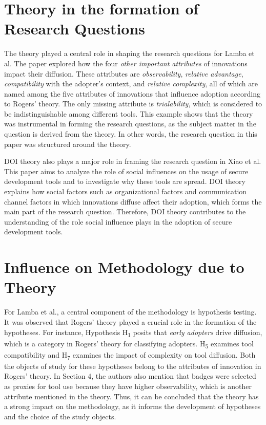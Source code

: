 \documentclass[journal,12pt,onecolumn,]{IEEEtran}
\begin{document}
\section{Theory in the formation of Research Questions}
The theory played a central role in shaping the research questions for Lamba et al. The paper explored how the four \textit{other important attributes} of innovations impact their diffusion.
These attributes are \textit{observability}, \textit{relative advantage}, \textit{compatibility} with the adopter's context, and \textit{relative complexity}, all of which are named among the five attributes of innovations that influence adoption according to Rogers' theory. The only missing attribute is \textit{trialability}, which is considered to be indistinguishable among different tools.
This example shows that the theory was instrumental in forming the research questions, as the subject matter in the question is derived from the theory. In other words, the research question in this paper was structured around the theory.

DOI theory also plays a major role in framing the research question in Xiao et al. This paper aims to analyze the role of social influences on the usage of secure development tools and to investigate why these tools are spread. DOI theory explains how social factors such as organizational factors and communication channel factors in which innovations diffuse affect their adoption,
which forms the main part of the research question. Therefore, DOI theory contributes to the understanding of the role social influence plays in the adoption of secure development tools.
\section{Influence on Methodology due to Theory}
For Lamba et al., a central component of the methodology is hypothesis testing. It was observed that Rogers' theory played a crucial role in the formation of the hypotheses.
For instance, Hypothesis H\textsubscript{1}  posits that \textit{early adopters} drive diffusion, which is a category in Rogers' theory for classifying adopters.
H\textsubscript{5} examines tool compatibility and H\textsubscript{7} examines the impact of complexity on tool diffusion. Both the objects of study for these hypotheses belong to the attributes of innovation in Rogers' theory.
In Section 4, the authors also mention that badges were selected as proxies for tool use because they have higher observability, which is another attribute mentioned in the theory.
Thus, it can be concluded that the theory has a strong impact on the methodology, as it informs the development of hypotheses and the choice of the study objects.
\end{document}
